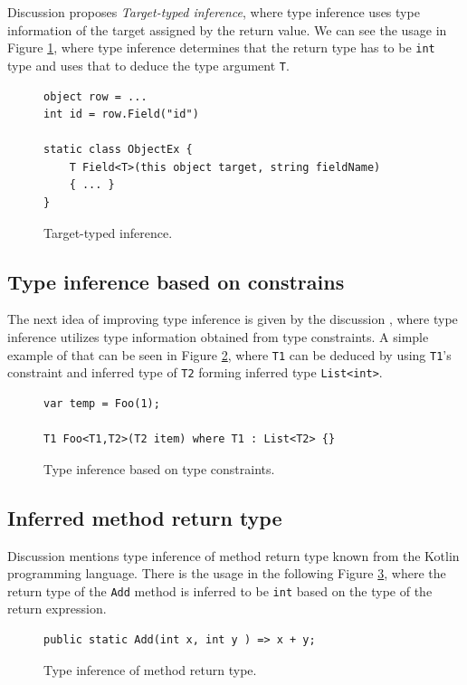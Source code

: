 Discussion \cite{online:RetTInference} proposes \textit{Target-typed inference}, where type inference uses type information of the target assigned by the return value. 
We can see the usage in Figure \ref{img62:RetTInf}, where type inference determines that the return type has to be \texttt{int} type and uses that to deduce the type argument \texttt{T}.
\begin{figure}[h]
\begin{lstlisting}[style=csharp]
object row = ...
int id = row.Field("id")

static class ObjectEx {
	T Field<T>(this object target, string fieldName) 
	{ ... }
}
\end{lstlisting}
\caption{Target-typed inference.}
\label{img62:RetTInf}
\end{figure}

\subsection{Type inference based on constrains}

The next idea of improving type inference is given by the discussion \cite{online:TInfConst}, where type inference utilizes type information obtained from type constraints.
A simple example of that can be seen in Figure \ref{img23:TInfConst}, where \texttt{T1} can be deduced by using \texttt{T1}'s constraint and inferred type of \texttt{T2} forming inferred type \texttt{List<int>}.
\begin{figure}[h!]
\begin{lstlisting}[style=csharp]
var temp = Foo(1);

T1 Foo<T1,T2>(T2 item) where T1 : List<T2> {}
\end{lstlisting}
\caption{Type inference based on type constraints.}
\label{img23:TInfConst}
\end{figure}

\subsection{Inferred method return type}

Discussion \cite{online:TMRetInf} mentions type inference of method return type known from the Kotlin programming language.
There is the usage in the following Figure \ref{img24:TMRetInf}, where the return type of the \texttt{Add} method is inferred to be \texttt{int} based on the type of the return expression.
\begin{figure}[h!]
\begin{lstlisting}[style=csharp]
public static Add(int x, int y ) => x + y;
\end{lstlisting}
\caption{Type inference of method return type.}
\label{img24:TMRetInf}
\end{figure}

